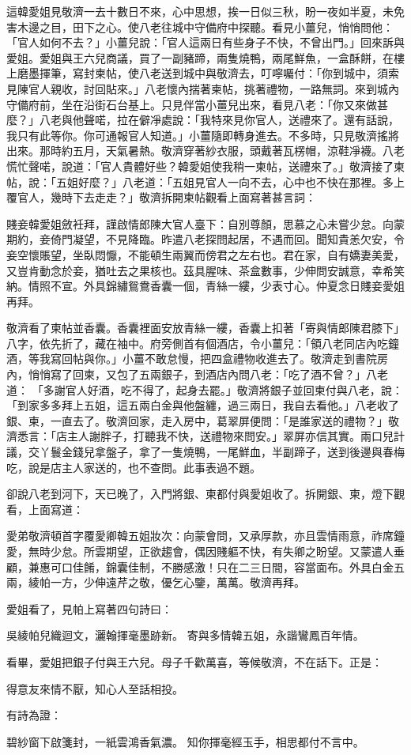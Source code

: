 這韓愛姐見敬濟一去十數日不來，心中思想，挨一日似三秋，盼一夜如半夏，未免害木邊之目，田下之心。使八老往城中守備府中探聽。看見小薑兒，悄悄問他： 「官人如何不去？」小薑兒說：「官人這兩日有些身子不快，不曾出門。」回來訴與愛姐。愛姐與王六兒商議，買了一副豬蹄，兩隻燒鴨，兩尾鮮魚，一盒酥餅，在樓上磨墨揮筆，寫封柬帖，使八老送到城中與敬濟去，叮嚀囑付：「你到城中，須索見陳官人親收，討回貼來。」八老懷內揣著柬帖，挑著禮物，一路無詞。來到城內守備府前，坐在沿街石台基上。只見伴當小薑兒出來，看見八老：「你又來做甚麼？」八老與他聲喏，拉在僻凈處說：「我特來見你官人，送禮來了。還有話說，我只有此等你。你可通報官人知道。」小薑隨即轉身進去。不多時，只見敬濟搖將出來。那時約五月，天氣暑熱。敬濟穿著紗衣服，頭戴著瓦楞帽，涼鞋凈襪。八老慌忙聲喏，說道：「官人貴體好些？韓愛姐使我稍一柬帖，送禮來了。」敬濟接了柬帖，說：「五姐好麼？」八老道：「五姐見官人一向不去，心中也不快在那裡。多上覆官人，幾時下去走走？」敬濟拆開柬帖觀看上面寫著甚言詞：

賤妾韓愛姐斂衽拜，謹啟情郎陳大官人臺下：自別尊顏，思慕之心未嘗少怠。向蒙期約，妾倚門凝望，不見降臨。昨遣八老探問起居，不遇而回。聞知貴恙欠安，令妾空懷賬望，坐臥悶懨，不能頓生兩翼而傍君之左右也。君在家，自有嬌妻美愛，又豈肯動念於妾，猶吐去之果核也。茲具腥味、茶盒數事，少伸問安誠意，幸希笑納。情照不宣。外具錦繡鴛鴦香囊一個，青絲一縷，少表寸心。仲夏念日賤妾愛姐再拜。

敬濟看了柬帖並香囊。香囊裡面安放青絲一縷，香囊上扣著「寄與情郎陳君膝下」八字，依先折了，藏在袖中。府旁側首有個酒店，令小薑兒：「領八老同店內吃鐘酒，等我寫回帖與你。」小薑不敢怠慢，把四盒禮物收進去了。敬濟走到書院房內，悄悄寫了回柬，又包了五兩銀子，到酒店內問八老：「吃了酒不曾？」八老道： 「多謝官人好酒，吃不得了，起身去罷。」敬濟將銀子並回柬付與八老，說：「到家多多拜上五姐，這五兩白金與他盤纏，過三兩日，我自去看他。」八老收了銀、柬，一直去了。敬濟回家，走入房中，葛翠屏便問：「是誰家送的禮物？」敬濟悉言：「店主人謝胖子，打聽我不快，送禮物來問安。」翠屏亦信其實。兩口兒計議，交丫鬟金錢兒拿盤子，拿了一隻燒鴨，一尾鮮血，半副蹄子，送到後邊與春梅吃，說是店主人家送的，也不查問。此事表過不題。

卻說八老到河下，天已晚了，入門將銀、柬都付與愛姐收了。拆開銀、柬，燈下觀看，上面寫道：

愛弟敬濟頓首字覆愛卿韓五姐妝次：向蒙會問，又承厚款，亦且雲情雨意，祚席鐘愛，無時少怠。所雲期望，正欲趨會，偶因賤軀不快，有失卿之盼望。又蒙遣人垂顧，兼惠可口佳餚，錦囊佳制，不勝感激！只在二三日間，容當面布。外具白金五兩，綾帕一方，少伸遠芹之敬，優乞心鑒，萬萬。敬濟再拜。

愛姐看了，見帕上寫著四句詩曰：

吳綾帕兒織迴文，灑翰揮毫墨跡新。
寄與多情韓五姐，永諧鸞鳳百年情。

看畢，愛姐把銀子付與王六兒。母子千歡萬喜，等候敬濟，不在話下。正是：

得意友來情不厭，知心人至話相投。

有詩為證：

碧紗窗下啟箋封，一紙雲鴻香氣濃。
知你揮毫經玉手，相思都付不言中。

